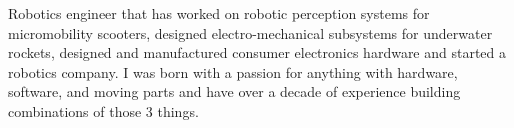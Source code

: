 

\begin{cvparagraph}

Robotics engineer that has worked on robotic perception systems for
micromobility scooters, designed electro-mechanical subsystems for underwater
rockets, designed and manufactured consumer electronics hardware and started a
robotics company. I was born with a passion for anything with hardware,
software, and moving parts and have over a decade of experience building
combinations of those 3 things. 
\end{cvparagraph}
